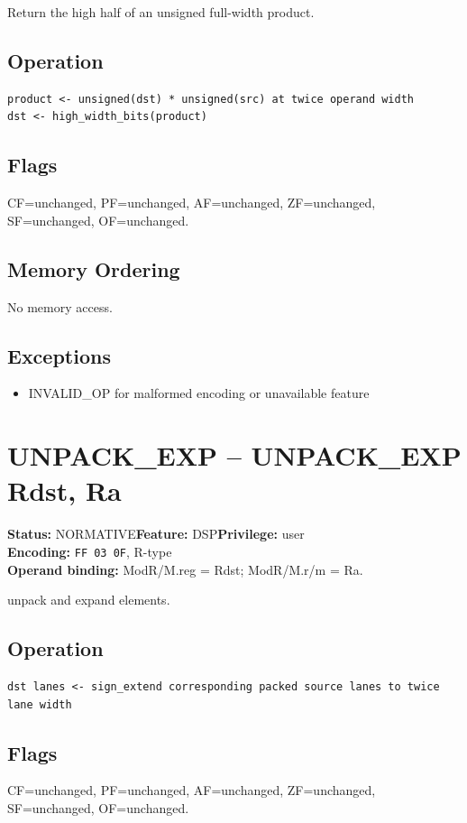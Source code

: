 \documentclass[10pt]{article}
\begin{document}
Return the high half of an unsigned full-width product.

\subsection*{Operation}
\begin{lstlisting}
product <- unsigned(dst) * unsigned(src) at twice operand width
dst <- high_width_bits(product)
\end{lstlisting}
\subsection*{Flags}
CF=unchanged, PF=unchanged, AF=unchanged, ZF=unchanged, SF=unchanged, OF=unchanged.
\subsection*{Memory Ordering}
No memory access.
\subsection*{Exceptions}
\begin{itemize}
\item INVALID\_OP for malformed encoding or unavailable feature
\end{itemize}
\clearpage

\section{UNPACK\_EXP -- UNPACK\_EXP Rdst, Ra}
\textbf{Status:} NORMATIVE\quad \textbf{Feature:} DSP\quad \textbf{Privilege:} user\\
\textbf{Encoding:} \texttt{FF 03 0F}, R-type\\
\textbf{Operand binding:} ModR/M.reg = Rdst; ModR/M.r/m = Ra.

unpack and expand elements.

\subsection*{Operation}
\begin{lstlisting}
dst lanes <- sign_extend corresponding packed source lanes to twice lane width
\end{lstlisting}
\subsection*{Flags}
CF=unchanged, PF=unchanged, AF=unchanged, ZF=unchanged, SF=unchanged, OF=unchanged.
\end{document}
